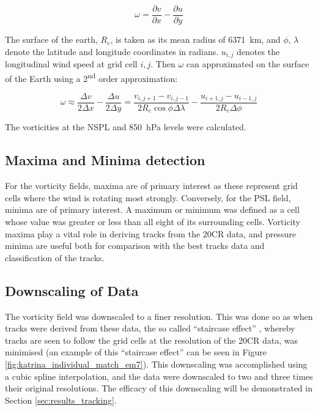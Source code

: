 \documentclass[pdftex,12pt,a4paper]{report}
\newcommand{\ts}{\textsuperscript}
\begin{document}
\begin{equation}
    \omega = \frac{\partial v}{\partial x} - \frac{\partial u}{\partial y}
    \label{eqn:vorticity}
\end{equation}

The surface of the earth, $R_e$, is taken as its mean radius of \SI{6371}{km}, and $\phi$, $\lambda$
denote the latitude and longitude coordinates in radians. $u_{i, j}$ denotes the longitudinal wind
speed at grid cell $i, j$. Then $\omega$ can approximated on the surface of the Earth using a
2\ts{nd} order approximation: %


\begin{equation}
    \omega \approx \frac{\Delta v}{2 \Delta x} - \frac{\Delta u}{2 \Delta y} = \frac{v_{i,j+1} - v_{i,j-1}}{2 R_e \cos{\phi} \Delta \lambda} - \frac{u_{i+1,j} - u_{i-1,j}}{2 R_e \Delta \phi }
    \label{eqn:vorticity_2nd_order}
\end{equation}

The vorticities at the NSPL and \SI{850}{hPa} levels were calculated.

\subsection{Maxima and Minima detection}
\label{sec:methods_maxima_minima}

For the vorticity fields, maxima are of primary interest as these represent grid cells where the
wind is rotating most strongly. Conversely, for the PSL field, minima are of primary interest. A
maximum or minimum was defined as a cell whose value was greater or less than all eight of its
surrounding cells. Vorticity maxima play a vital role in deriving tracks from the 20CR data, and
pressure minima are useful both for comparison with the best tracks data and classification of the
tracks.

\subsection{Downscaling of Data}

The vorticity field was downscaled to a finer resolution. This was done so as when tracks were
derived from these data, the so called ``staircase effect'' \parencite{hodges1994general}, whereby
tracks are seen to follow the grid cells at the resolution of the 20CR data, was minimised (an
example of this ``staircase effect'' can be seen in Figure \ref{fig:katrina_individual_match_em7}).
This downscaling was accomplished using a cubic spline interpolation, and the data were downscaled
to two and three times their original resolutions. The efficacy of this downscaling will be
demonstrated in Section \ref{sec:results_tracking}.
\end{document}
